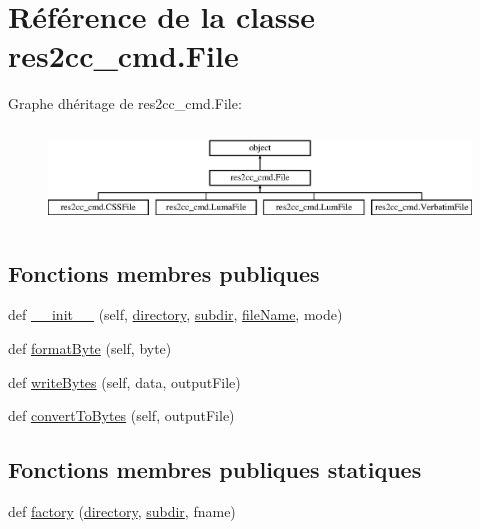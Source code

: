 \hypertarget{classres2cc__cmd_1_1_file}{}\section{Référence de la classe res2cc\+\_\+cmd.\+File}
\label{classres2cc__cmd_1_1_file}
Graphe d\textquotesingle{}héritage de res2cc\+\_\+cmd.\+File\+:\begin{figure}[H]
\begin{center}
\leavevmode
\includegraphics[height=2.560976cm]{classres2cc__cmd_1_1_file}
\end{center}
\end{figure}
\subsection*{Fonctions membres publiques}
\begin{DoxyCompactItemize}
\item 
def \hyperlink{classres2cc__cmd_1_1_file_a8cd6fc2e494abb7fffdcade5e795e604}{\+\_\+\+\_\+init\+\_\+\+\_\+} (self, \hyperlink{classres2cc__cmd_1_1_file_ac4d2f8723afe8f54e99abc605b1f0cc6}{directory}, \hyperlink{classres2cc__cmd_1_1_file_ae6919ea0849ff51ff2679de78b50f44c}{subdir}, \hyperlink{classres2cc__cmd_1_1_file_ae2daaffd697b334701ec4a53d6c5e86d}{file\+Name}, mode)
\item 
def \hyperlink{classres2cc__cmd_1_1_file_ac0b99df4d5caba3311d18ae7b08dfd64}{format\+Byte} (self, byte)
\item 
def \hyperlink{classres2cc__cmd_1_1_file_adaa5b0dc35c50cec7cf1c816dda8694a}{write\+Bytes} (self, data, output\+File)
\item 
def \hyperlink{classres2cc__cmd_1_1_file_a9f6432a73ece44e2ce3b50c033971b26}{convert\+To\+Bytes} (self, output\+File)
\end{DoxyCompactItemize}
\subsection*{Fonctions membres publiques statiques}
\begin{DoxyCompactItemize}
\item 
def \hyperlink{classres2cc__cmd_1_1_file_abfd845a0deb0b3499595c852121930f7}{factory} (\hyperlink{classres2cc__cmd_1_1_file_ac4d2f8723afe8f54e99abc605b1f0cc6}{directory}, \hyperlink{classres2cc__cmd_1_1_file_ae6919ea0849ff51ff2679de78b50f44c}{subdir}, fname)
\end{DoxyCompactItemize}
